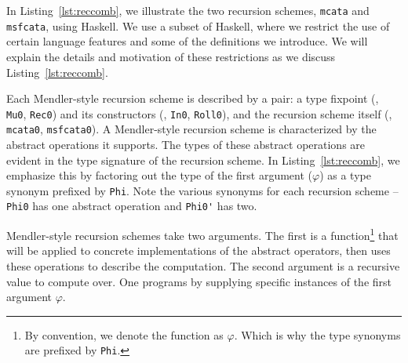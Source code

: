 In Listing~\ref{lst:reccomb}, we illustrate the two recursion schemes,
\lstinline{mcata} and \lstinline{msfcata}, using Haskell.
We use a subset of Haskell, where we restrict the use of certain language
features and some of the definitions we introduce. We will explain
the details and motivation of these restrictions as we discuss
Listing~\ref{lst:reccomb}.

Each Mendler-style recursion scheme is described by a pair:
a type fixpoint (\eg, \lstinline{Mu0}, \lstinline{Rec0}) and
its constructors (\eg, \lstinline{In0}, \lstinline{Roll0}),
and the recursion scheme itself (\eg, \lstinline{mcata0}, \lstinline{msfcata0}).
A Mendler-style recursion scheme is characterized by
the abstract operations it supports. The types of
these abstract operations are evident in the type signature
of the recursion scheme. In Listing~\ref{lst:reccomb},
we emphasize this by factoring out the type of the first argument ($\varphi$)
as a type synonym prefixed by \lstinline{Phi}. Note the various synonyms
for each recursion scheme -- \lstinline{Phi0} has one abstract operation
and \lstinline{Phi0'} has two.

Mendler-style recursion schemes take two arguments.
The first is a function\footnote{By convention,
	we denote the function as $\varphi$. Which is why
	the type synonyms are prefixed by \lstinline{Phi}.}
that will be applied to concrete implementations of the abstract operators,
then uses these operations to describe the computation.
The second argument is a recursive value to compute over.
One programs by supplying specific instances of the first argument $\varphi$.

